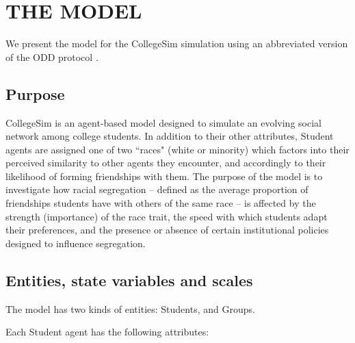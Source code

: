 
\section{THE MODEL}
\label{sec:model}

We present the model for the CollegeSim simulation using an abbreviated
version of the ODD protocol \cite{polhill_using_2008}.

\subsection{Purpose}

CollegeSim is an agent-based model designed to simulate an evolving social
network among college students. In addition to their other attributes, Student
agents are assigned one of two ``races" (white or minority) which factors into
their perceived similarity to other agents they encounter, and accordingly to
their likelihood of forming friendships with them. The purpose of the model is
to investigate how racial segregation -- defined as the average proportion of
friendships students have with others of the same race -- is affected by the
strength (importance) of the race trait, the speed with which students adapt
their preferences, and the presence or absence of certain institutional
policies designed to influence segregation.

\subsection{Entities, state variables and scales}

The model has two kinds of entities: Students, and Groups.


Each Student agent has the following attributes:

